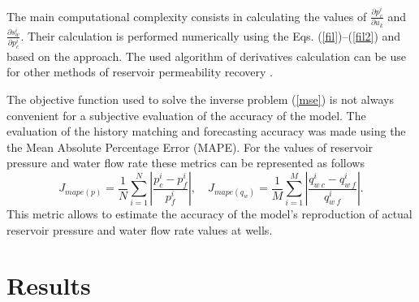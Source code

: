 \documentclass[
11pt,%
tightenlines,%
twoside,%
onecolumn,%
nofloats,%
nobibnotes,%
nofootinbib,%
superscriptaddress,%
noshowpacs,%
centertags]%
{revtex4}
\begin{document}
The main computational complexity consists in calculating the values of
$\frac{\partial p_c^i}{\partial u_k}$ and $\frac{\partial
s_w^i}{\partial p_c^i}$. Their calculation is performed numerically
using the Eqs. (\ref{fil})--(\ref{fil2}) and based on the \cite{opt}
approach. The used algorithm of derivatives calculation can be use for other methods of reservoir permeability recovery \cite{leg}.

The objective function used to solve the inverse problem
({\ref{mse}}) is not always convenient for a subjective evaluation
of the accuracy of the model. 
The evaluation of the history matching and forecasting accuracy was made using the the Mean Absolute Percentage Error (MAPE).
For the values of reservoir pressure and water
flow rate these metrics can be represented as follows
\begin{equation*} \label{mape_p}
    J_{mape(p)}=\frac{1}{N}\sum_{i=1}^N{\left|\frac{p_c^i-p_f^i}{p_f^i}\right|},\quad
    J_{mape(q_w)}=\frac{1}{M}\sum_{i=1}^M{\left|\frac{q_{w\:c}^i-q_{w\:f}^i}{q_{w\:f}^i}\right|}.
\end{equation*}
This metric allows to estimate the accuracy of the model's reproduction of actual reservoir pressure and water flow rate values at wells.

\section{Results}
\end{document}
